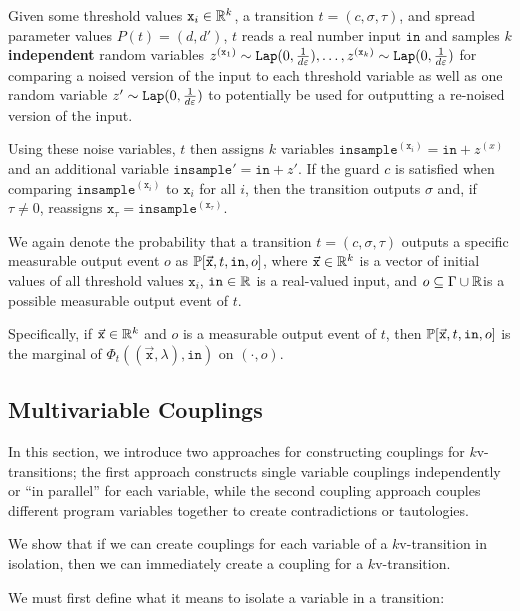 Given some threshold values $\texttt{x}_i\in \mathbb{R}^k$, a transition $t = (c, \sigma, \tau)$, and spread parameter values $P(t) = (d, d')$, $t$ reads a real number input $\texttt{in}$ and 
samples $k$ \textbf{independent} random variables $z^{(\texttt{x}_1)}\sim\texttt{Lap}(0, \frac{1}{d\varepsilon}),\ldots, z^{(\texttt{x}_k)}\sim\texttt{Lap}(0, \frac{1}{d\varepsilon})$ for comparing a noised version of the input to each threshold variable as well as one random variable $z' \sim\texttt{Lap}(0, \frac{1}{d\varepsilon})$ to potentially be used for outputting a re-noised version of the input. 

Using these noise variables, $t$ then assigns $k$ variables $\texttt{insample}^{(\texttt{x}_i)} = \texttt{in} + z^{(x)}$ and an additional variable $\texttt{insample}' = \texttt{in} + z'$. 
If the guard $c$ is satisfied when comparing $\texttt{insample}^{(\texttt{x}_i)}$ to $\texttt{x}_i$ for all $i$, then the transition outputs $\sigma$ and, if $\tau\neq 0$, reassigns $\texttt{x}_{\tau} = \texttt{insample}^{(\texttt{x}_\tau)}$.

We again denote the probability that a transition $t=(c, \sigma, \tau)$ outputs a specific measurable output event $o$ as $\mathbb{P}[\vec{\texttt{x}}, t, \texttt{in}, o]$, where $\vec{\texttt{x}}\in \mathbb{R}^k$ is a vector of initial values of all threshold values $\texttt{x}_i$, $\texttt{in}\in \mathbb{R}$ is a real-valued input, and $o\subseteq \Gamma\cup\mathbb{R}$is a possible measurable output event of $t$.

Specifically, if $\vec{\texttt{x}}\in \mathbb{R}^k$ and $o$ is a measurable output event of $t$, then $\mathbb{P}[\vec{\texttt{x}}, t, \texttt{in}, o]$ is the marginal of $\Phi_t((\vec{\texttt{x}}, \lambda), \texttt{in})$ on $(\cdot, o)$.

\subsection{Multivariable Couplings}

In this section, we introduce two approaches for constructing couplings for $k$v-transitions; the first approach constructs single variable couplings independently or ``in parallel'' for each variable, while the second coupling approach couples different program variables together to create contradictions or tautologies. 

We show that if we can create couplings for each variable of a $k$v-transition in isolation, then we can immediately create a coupling for a $k$v-transition. 

We must first define what it means to isolate a variable in a transition: 

